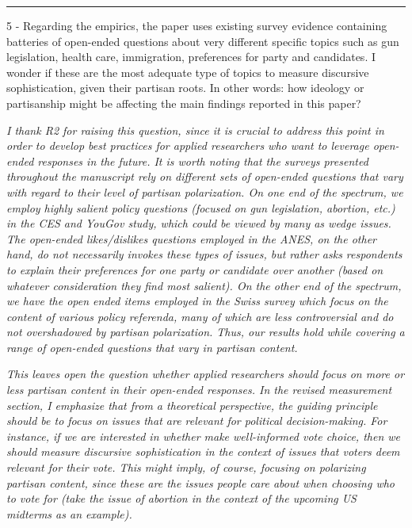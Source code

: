 
\rule{\linewidth}{.01cm}

5 - Regarding the empirics, the paper uses existing survey evidence containing batteries of open-ended questions about very different specific topics such as gun legislation, health care, immigration, preferences for party and candidates. I wonder if these are the most adequate type of topics to measure discursive sophistication, given their partisan roots. In other words: how ideology or partisanship might be affecting the main findings reported in this paper?

\textit{I thank R2 for raising this question, since it is crucial to address this point in order to develop best practices for applied researchers who want to leverage open-ended responses in the future. It is worth noting that the surveys presented throughout the manuscript rely on different sets of open-ended questions that vary with regard to their level of partisan polarization. On one end of the spectrum, we employ highly salient policy questions (focused on gun legislation, abortion, etc.) in the CES and YouGov study, which could be viewed by many as wedge issues. The open-ended likes/dislikes questions employed in the ANES, on the other hand, do not necessarily invokes these types of issues, but rather asks respondents to explain their preferences for one party or candidate over another (based on whatever consideration they find most salient). On the other end of the spectrum, we have the open ended items employed in the Swiss survey which focus on the content of various policy referenda, many of which are less controversial and do not overshadowed by partisan polarization. Thus, our results hold while covering a range of open-ended questions that vary in partisan content.}
	
\textit{This leaves open the question whether applied researchers should focus on more or less partisan content in their open-ended responses. In the revised measurement section, I emphasize that from a theoretical perspective, the guiding principle should be to focus on issues that are relevant for political decision-making. For instance, if we are interested in whether make well-informed vote choice, then we should measure discursive sophistication in the context of issues that voters deem relevant for their vote. This might imply, of course, focusing on polarizing partisan content, since these are the issues people care about when choosing who to vote for (take the issue of abortion in the context of the upcoming US midterms as an example).}
	

